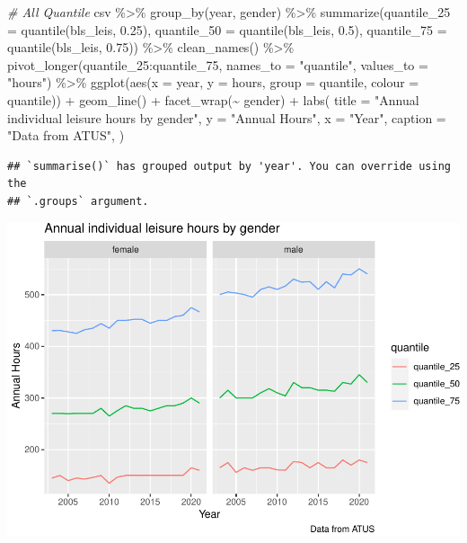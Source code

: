 \documentclass[
]{article}
\newenvironment{Shaded}{\begin{snugshade}}{\end{snugshade}}
\newcommand{\AttributeTok}[1]{\textcolor[rgb]{0.77,0.63,0.00}{#1}}
\newcommand{\CommentTok}[1]{\textcolor[rgb]{0.56,0.35,0.01}{\textit{#1}}}
\newcommand{\FloatTok}[1]{\textcolor[rgb]{0.00,0.00,0.81}{#1}}
\newcommand{\FunctionTok}[1]{\textcolor[rgb]{0.00,0.00,0.00}{#1}}
\newcommand{\NormalTok}[1]{#1}
\newcommand{\SpecialCharTok}[1]{\textcolor[rgb]{0.00,0.00,0.00}{#1}}
\newcommand{\StringTok}[1]{\textcolor[rgb]{0.31,0.60,0.02}{#1}}
\begin{document}
\begin{Shaded}
\begin{Highlighting}[]
\CommentTok{\# All Quantile}
\NormalTok{csv }\SpecialCharTok{\%\textgreater{}\%}
  \FunctionTok{group\_by}\NormalTok{(year, gender) }\SpecialCharTok{\%\textgreater{}\%}
  \FunctionTok{summarize}\NormalTok{(}\AttributeTok{quantile\_25 =} \FunctionTok{quantile}\NormalTok{(bls\_leis, }\FloatTok{0.25}\NormalTok{), }\AttributeTok{quantile\_50 =} \FunctionTok{quantile}\NormalTok{(bls\_leis, }\FloatTok{0.5}\NormalTok{), }\AttributeTok{quantile\_75 =} \FunctionTok{quantile}\NormalTok{(bls\_leis, }\FloatTok{0.75}\NormalTok{)) }\SpecialCharTok{\%\textgreater{}\%}
  \FunctionTok{clean\_names}\NormalTok{() }\SpecialCharTok{\%\textgreater{}\%}
  \FunctionTok{pivot\_longer}\NormalTok{(quantile\_25}\SpecialCharTok{:}\NormalTok{quantile\_75, }\AttributeTok{names\_to =} \StringTok{"quantile"}\NormalTok{, }\AttributeTok{values\_to =} \StringTok{"hours"}\NormalTok{) }\SpecialCharTok{\%\textgreater{}\%}
  \FunctionTok{ggplot}\NormalTok{(}\FunctionTok{aes}\NormalTok{(}\AttributeTok{x =}\NormalTok{ year, }\AttributeTok{y =}\NormalTok{ hours, }\AttributeTok{group =}\NormalTok{ quantile, }\AttributeTok{colour =}\NormalTok{ quantile)) }\SpecialCharTok{+}
  \FunctionTok{geom\_line}\NormalTok{() }\SpecialCharTok{+}
    \FunctionTok{facet\_wrap}\NormalTok{(}\SpecialCharTok{\textasciitilde{}}\NormalTok{ gender) }\SpecialCharTok{+}
  \FunctionTok{labs}\NormalTok{(}
  \AttributeTok{title =} \StringTok{"Annual individual leisure hours by gender"}\NormalTok{,}
  \AttributeTok{y =} \StringTok{"Annual Hours"}\NormalTok{,}
  \AttributeTok{x =} \StringTok{"Year"}\NormalTok{,}
  \AttributeTok{caption =} \StringTok{"Data from ATUS"}\NormalTok{,}
\NormalTok{) }
\end{Highlighting}
\end{Shaded}

\begin{verbatim}
## `summarise()` has grouped output by 'year'. You can override using the
## `.groups` argument.
\end{verbatim}

\includegraphics{Paper2_files/figure-latex/graphs-6.pdf}
\end{document}
